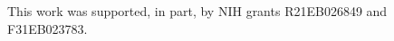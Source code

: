 \documentclass[12pt]{spieman}  %
\begin{document}
\begin{spacing}{1}
\vspace{5mm}

\acknowledgments

This work was supported, in part, by NIH grants R21EB026849 and F31EB023783.

\small



\end{spacing}
\end{document}
